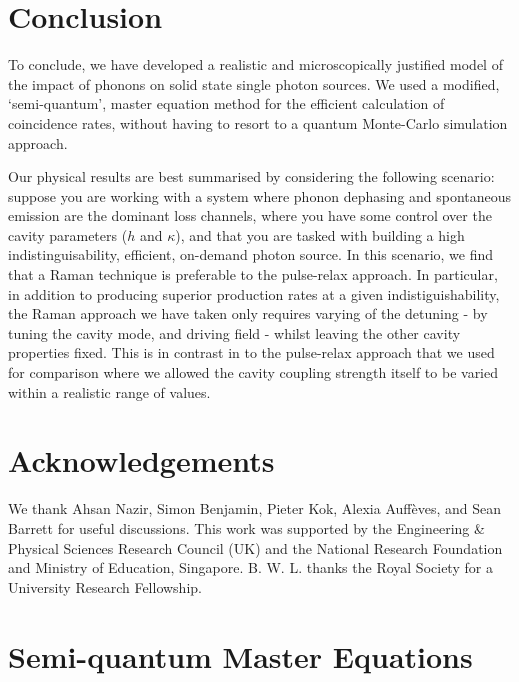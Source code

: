 \section{Conclusion}

To conclude, we have developed a realistic and microscopically justified model of the impact of phonons on solid state single photon sources. We used a modified, `semi-quantum', master equation method for the efficient calculation of coincidence rates, without having to resort to a quantum Monte-Carlo simulation approach.

Our physical results are best summarised by considering the following scenario: suppose you are working with a system where phonon dephasing and spontaneous emission are the dominant loss channels, where you have some control over the cavity parameters ($h$ and $\kappa$), and that you are tasked with building a high indistinguisability, efficient, on-demand photon source. In this scenario, we find that a Raman technique is preferable to the pulse-relax approach. In particular, in addition to producing superior production rates at a given indistiguishability, the Raman approach we have taken only requires varying of the detuning - by tuning the cavity mode, and driving field - whilst leaving the other cavity properties fixed. This is in contrast in to the pulse-relax approach that we used for comparison where we allowed the cavity coupling strength itself to be varied within a realistic range of values. 



\section{Acknowledgements} We thank Ahsan Nazir, Simon Benjamin, Pieter Kok, Alexia Auff\`eves, and Sean Barrett for useful discussions. This work was supported by the Engineering \& Physical Sciences Research Council (UK) and the National Research Foundation and Ministry of Education, Singapore. B. W. L. thanks the Royal Society for a University Research Fellowship. 

\appendix
\section{Semi-quantum Master Equations}
\label{appA}

